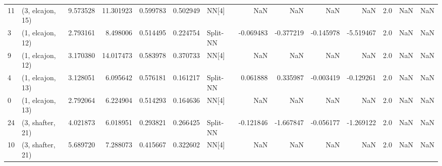\begin{tabular}{llrrrrlrrrrrrl}
11 &  (3, elcajon, 15) &   9.573528 &  11.301923 &   0.599783 &  0.502949 &       NN[4] &             NaN &           NaN &            NaN &          NaN &            2.0 &    NaN &              NaN \\
3  &  (1, elcajon, 12) &   2.793161 &   8.498006 &   0.514495 &  0.224754 &    Split-NN &       -0.069483 &     -0.377219 &      -0.145978 &    -5.519467 &            2.0 &    NaN &              NaN \\
9  &  (1, elcajon, 12) &   3.170380 &  14.017473 &   0.583978 &  0.370733 &       NN[4] &             NaN &           NaN &            NaN &          NaN &            2.0 &    NaN &              NaN \\
4  &  (1, elcajon, 13) &   3.128051 &   6.095642 &   0.576181 &  0.161217 &    Split-NN &        0.061888 &      0.335987 &      -0.003419 &    -0.129261 &            2.0 &    NaN &              NaN \\
0  &  (1, elcajon, 13) &   2.792064 &   6.224904 &   0.514293 &  0.164636 &       NN[4] &             NaN &           NaN &            NaN &          NaN &            2.0 &    NaN &              NaN \\
24 &  (3, shafter, 21) &   4.021873 &   6.018951 &   0.293821 &  0.266425 &    Split-NN &       -0.121846 &     -1.667847 &      -0.056177 &    -1.269122 &            2.0 &    NaN &              NaN \\
10 &  (3, shafter, 21) &   5.689720 &   7.288073 &   0.415667 &  0.322602 &       NN[4] &             NaN &           NaN &            NaN &          NaN &            2.0 &    NaN &              NaN \\
\bottomrule
\end{tabular}
